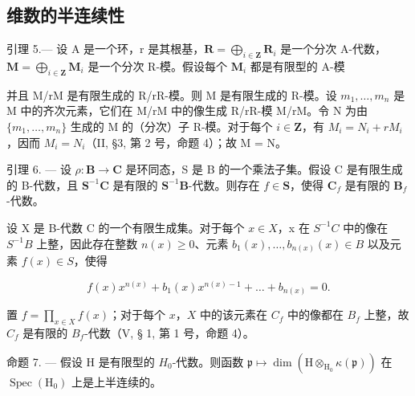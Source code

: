 \subsection{维数的半连续性}

引理 5.--- 设 A 是一个环，r 是其根基，\(\mathbf{R} = \bigoplus_{i \in \mathbf{Z}} \mathbf{R}_i\) 是一个分次 A-代数，\(\mathbf{M} = \bigoplus_{i \in \mathbf{Z}} \mathbf{M}_i\) 是一个分次 R-模。假设每个 \(\mathbf{M}_i\) 都是有限型的 A-模

并且 M/rM 是有限生成的 R/rR-模。则 M 是有限生成的 R-模。设 \(m_{1}, \ldots, m_{n}\) 是 M 中的齐次元素，它们在 M/rM 中的像生成 R/rR-模 M/rM。令 N 为由 \(\{m_{1}, \ldots, m_{n}\}\) 生成的 M 的（分次）子 R-模。对于每个 \(i \in \mathbf{Z}\)，有 \(M_{i} = N_{i} + rM_{i}\)，因而 \(M_{i} = N_{i}\)（II, §3, 第 2 号，命题 4）；故 M = N。

引理 6. --- 设 \(\rho: \mathbf{B} \to \mathbf{C}\) 是环同态，S 是 B 的一个乘法子集。假设 C 是有限生成的 B-代数，且 \(\mathbf{S}^{-1}\mathbf{C}\) 是有限的 \(\mathbf{S}^{-1}\mathbf{B}\)-代数。则存在 \(f \in \mathbf{S}\)，使得 \(\mathbf{C}_f\) 是有限的 \(\mathbf{B}_f\)-代数。

设 X 是 B-代数 C 的一个有限生成集。对于每个 \(x \in X\)，x 在 \(S^{-1}C\) 中的像在 \(S^{-1}B\) 上整，因此存在整数 \(n(x) \geqslant 0\)、元素 \(b_{1}(x), \ldots, b_{n(x)}(x) \in B\) 以及元素 \(f(x) \in S\)，使得

\[
f (x) x ^ {n (x)} + b _ {1} (x) x ^ {n (x) - 1} + \dots + b _ {n (x)} = 0.
\]

置 \(f = \prod_{x \in X} f(x)\)；对于每个 \(x\)，\(X\) 中的该元素在 \(C_f\) 中的像都在 \(B_f\) 上整，故 \(C_f\) 是有限的 \(B_f\)-代数（V, § 1, 第 1 号，命题 4）。

命题 7. — 假设 H 是有限型的 \(H_{0}\)-代数。则函数 \(\mathfrak{p} \mapsto \dim(\mathrm{H} \otimes_{\mathrm{H}_{0}} \kappa(\mathfrak{p}))\) 在 \(\operatorname{Spec}(\mathrm{H}_{0})\) 上是上半连续的。

